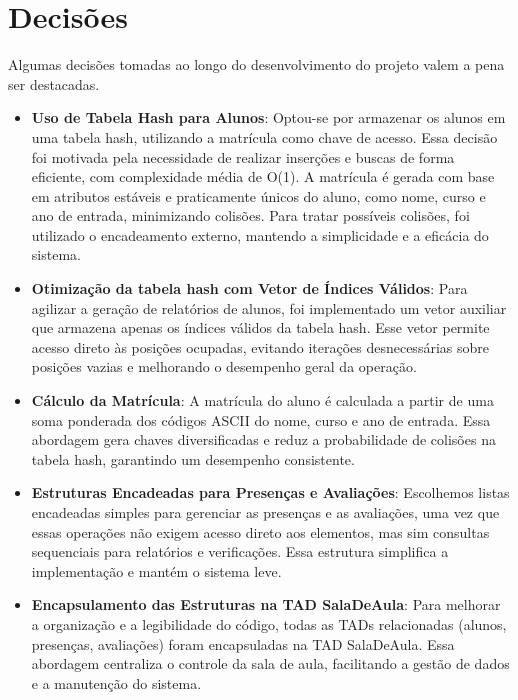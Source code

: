 \documentclass{article}
\begin{document}
\section{Decisões}
Algumas decisões tomadas ao longo do desenvolvimento do projeto valem a pena ser destacadas. 
\begin{itemize} 
    \item \textbf{Uso de Tabela Hash para Alunos}: Optou-se por armazenar os alunos em uma tabela hash, utilizando a matrícula como chave de acesso. Essa decisão foi motivada pela necessidade de realizar inserções e buscas de forma eficiente, com complexidade média de O(1). A matrícula é gerada com base em atributos estáveis e praticamente únicos do aluno, como nome, curso e ano de entrada, minimizando colisões. Para tratar possíveis colisões, foi utilizado o encadeamento externo, mantendo a simplicidade e a eficácia do sistema.

    \item \textbf{Otimização da tabela hash com Vetor de Índices Válidos}: Para agilizar a geração de relatórios de alunos, foi implementado um vetor auxiliar que armazena apenas os índices válidos da tabela hash. Esse vetor permite acesso direto às posições ocupadas, evitando iterações desnecessárias sobre posições vazias e melhorando o desempenho geral da operação.
    
    \item \textbf{Cálculo da Matrícula}: A matrícula do aluno é calculada a partir de uma soma ponderada dos códigos ASCII do nome, curso e ano de entrada. Essa abordagem gera chaves diversificadas e reduz a probabilidade de colisões na tabela hash, garantindo um desempenho consistente.
    
    \item \textbf{Estruturas Encadeadas para Presenças e Avaliações}: Escolhemos listas encadeadas simples para gerenciar as presenças e as avaliações, uma vez que essas operações não exigem acesso direto aos elementos, mas sim consultas sequenciais para relatórios e verificações. Essa estrutura simplifica a implementação e mantém o sistema leve.
    
    \item \textbf{Encapsulamento das Estruturas na TAD SalaDeAula}: Para melhorar a organização e a legibilidade do código, todas as TADs relacionadas (alunos, presenças, avaliações) foram encapsuladas na TAD SalaDeAula. Essa abordagem centraliza o controle da sala de aula, facilitando a gestão de dados e a manutenção do sistema.
    

\end{itemize}
\end{document}
